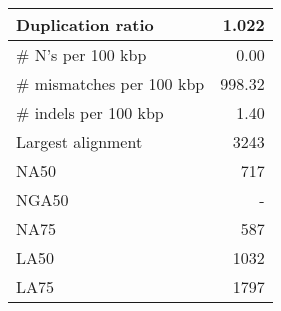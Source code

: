 \documentclass[12pt,a4paper]{article}
\begin{document}
\begin{table}[ht]
\begin{center}
\begin{tabular}{|l*{1}{|r}|}
Duplication ratio & 1.022 \\ \hline
\# N's per 100 kbp & 0.00 \\ \hline
\# mismatches per 100 kbp & 998.32 \\ \hline
\# indels per 100 kbp & 1.40 \\ \hline
Largest alignment & 3243 \\ \hline
NA50 & 717 \\ \hline
NGA50 & - \\ \hline
NA75 & 587 \\ \hline
LA50 & 1032 \\ \hline
LA75 & 1797 \\ \hline
\end{tabular}
\end{center}
\end{table}
\end{document}
